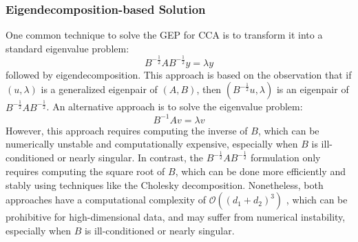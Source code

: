 \subsubsection{Eigendecomposition-based Solution}
One common technique to solve the GEP for CCA is to transform it into a standard eigenvalue problem:
\begin{equation}
B^{-\frac{1}{2}} A B^{-\frac{1}{2}} y = \lambda y
\end{equation}
followed by eigendecomposition. This approach is based on the observation that if $(u, \lambda)$ is a generalized eigenpair of $(A, B)$, then $(B^{-\frac{1}{2}}u, \lambda)$ is an eigenpair of $B^{-\frac{1}{2}} A B^{-\frac{1}{2}}$.
An alternative approach is to solve the eigenvalue problem:
\begin{equation}
B^{-1} A v = \lambda v
\end{equation}
However, this approach requires computing the inverse of $B$, which can be numerically unstable and computationally expensive, especially when $B$ is ill-conditioned or nearly singular. In contrast, the $B^{-\frac{1}{2}} A B^{-\frac{1}{2}}$ formulation only requires computing the square root of $B$, which can be done more efficiently and stably using techniques like the Cholesky decomposition.
Nonetheless, both approaches have a computational complexity of $\mathcal{O}((d_1+d_2)^3)$ \citep{golub2013matrix}, which can be prohibitive for high-dimensional data, and may suffer from numerical instability, especially when $B$ is ill-conditioned or nearly singular.

